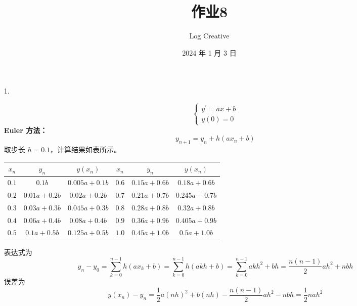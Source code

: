 \documentclass{sjtuarticle}
\title{作业8}
\author{Log Creative}
\date{2024 年 1 月 3 日}
\begin{document}
\maketitle


\begin{itemize}
    \item[1.] \begin{solution}
       \begin{equation*}
            \begin{cases}
                y^\prime = ax+b \\
                y(0) = 0
            \end{cases}
        \end{equation*}
        \textbf{Euler 方法：}\begin{equation*}
            y_{n+1}=y_n+h(ax_n+b)
        \end{equation*}
        取步长 $h=0.1$，计算结果如表所示。
        \begin{table}[h]
            \centering
            \begin{tabular}{ccc|ccc}
                \toprule
                $x_n$ & $y_n$ & $y(x_n)$ & $x_n$ & $y_n$ & $y(x_n)$ \\
                \midrule
                $0.1$   & $0.1 b$       & $0.005 a + 0.1 b$ & $0.6$   & $0.15 a + 0.6 b$      & $0.18 a + 0.6 b$ \\
                $0.2$   & $0.01 a + 0.2 b$      & $0.02 a + 0.2 b$ &                 $0.7$   & $0.21 a + 0.7 b$      & $0.245 a + 0.7 b$ \\
                $0.3$   & $0.03 a + 0.3 b$      & $0.045 a + 0.3 b$ &                 $0.8$   & $0.28 a + 0.8 b$      & $0.32 a + 0.8 b$ \\
                $0.4$   & $0.06 a + 0.4 b$      & $0.08 a + 0.4 b$ &                 $0.9$   & $0.36 a + 0.9 b$      & $0.405 a + 0.9 b$ \\
                $0.5$   & $0.1 a + 0.5 b$       & $0.125 a + 0.5 b$ &                 $1.0$   & $0.45 a + 1.0 b$      & $0.5 a + 1.0 b$ \\
                \bottomrule
            \end{tabular}
        \end{table}

        表达式为
        \begin{equation*}
            y_{n} - y_0 = \sum_{k=0}^{n-1} h(ax_k+b) =\sum_{k=0}^{n-1} h(akh+b) = \sum_{k=0}^{n-1} akh^2+bh = \frac{n(n-1)}{2}ah^2 +nbh
        \end{equation*}
        误差为
        \begin{equation*}
            y(x_n) - y_n = \frac{1}{2}a(nh)^2+b(nh)-\frac{n(n-1)}{2}ah^2 -nbh=\frac{1}{2}nah^2
        \end{equation*}


\end{solution}
\end{itemize}
\end{document}
